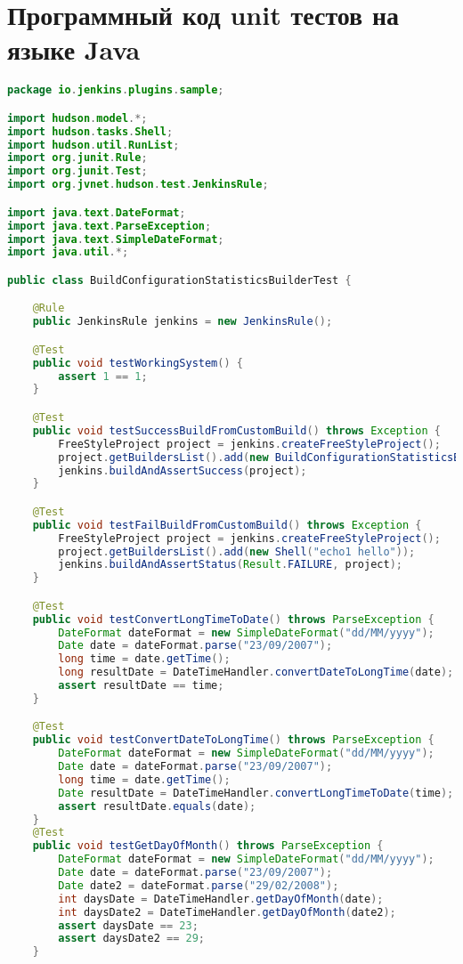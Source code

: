 \chapter{Программный код unit тестов на языке Java}\label{appendix-extra-examples}

\begin{lstlisting}[language=Java]
package io.jenkins.plugins.sample;

import hudson.model.*;
import hudson.tasks.Shell;
import hudson.util.RunList;
import org.junit.Rule;
import org.junit.Test;
import org.jvnet.hudson.test.JenkinsRule;

import java.text.DateFormat;
import java.text.ParseException;
import java.text.SimpleDateFormat;
import java.util.*;

public class BuildConfigurationStatisticsBuilderTest {

    @Rule
    public JenkinsRule jenkins = new JenkinsRule();

    @Test
    public void testWorkingSystem() {
        assert 1 == 1;
    }

    @Test
    public void testSuccessBuildFromCustomBuild() throws Exception {
        FreeStyleProject project = jenkins.createFreeStyleProject();
        project.getBuildersList().add(new BuildConfigurationStatisticsBuilder());
        jenkins.buildAndAssertSuccess(project);
    }

    @Test
    public void testFailBuildFromCustomBuild() throws Exception {
        FreeStyleProject project = jenkins.createFreeStyleProject();
        project.getBuildersList().add(new Shell("echo1 hello"));
        jenkins.buildAndAssertStatus(Result.FAILURE, project);
    }

    @Test
    public void testConvertLongTimeToDate() throws ParseException {
        DateFormat dateFormat = new SimpleDateFormat("dd/MM/yyyy");
        Date date = dateFormat.parse("23/09/2007");
        long time = date.getTime();
        long resultDate = DateTimeHandler.convertDateToLongTime(date);
        assert resultDate == time;
    }

    @Test
    public void testConvertDateToLongTime() throws ParseException {
        DateFormat dateFormat = new SimpleDateFormat("dd/MM/yyyy");
        Date date = dateFormat.parse("23/09/2007");
        long time = date.getTime();
        Date resultDate = DateTimeHandler.convertLongTimeToDate(time);
        assert resultDate.equals(date);
    }
    @Test
    public void testGetDayOfMonth() throws ParseException {
        DateFormat dateFormat = new SimpleDateFormat("dd/MM/yyyy");
        Date date = dateFormat.parse("23/09/2007");
        Date date2 = dateFormat.parse("29/02/2008");
        int daysDate = DateTimeHandler.getDayOfMonth(date);
        int daysDate2 = DateTimeHandler.getDayOfMonth(date2);
        assert daysDate == 23;
        assert daysDate2 == 29;
    }


\end{lstlisting}
